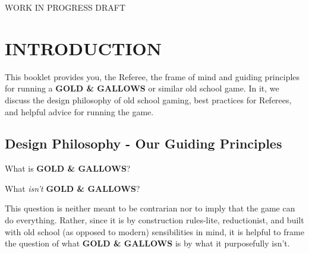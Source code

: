 \documentclass[twoside]{article}
\begin{document}
\begin{titlepage}
\centering

\phantom{x}

\vspace{1in}

{\myfonta\raisebox{1ex}{\large \phantom{Official}} }

\vspace{3ex}

{\myfontb{}}

WORK IN PROGRESS DRAFT
\end{titlepage}
\pagebreak

\restoregeometry
\begin{center}
\tableofcontents
\end{center}

\twocolumn

\section*{INTRODUCTION}

This booklet provides you, the Referee, the frame of mind and guiding principles for running a \textbf{GOLD \& GALLOWS} or similar old school game. In it, we discuss the design philosophy of old school gaming, best practices for Referees, and helpful advice for running the game.

\subsection*{Design Philosophy - Our Guiding Principles}

What is \textbf{GOLD \& GALLOWS}?

\bigbreak

What \textit{isn't} \textbf{GOLD \& GALLOWS}? 

\bigbreak

This question is neither meant to be contrarian nor to imply that the game can do everything. Rather, since it is by construction rules-lite, reductionist, and built with old school (as opposed to modern) sensibilities in mind, it is helpful to frame the question of what \textbf{GOLD \& GALLOWS} is by what it purposefully isn't.

\bigbreak
\end{document}
